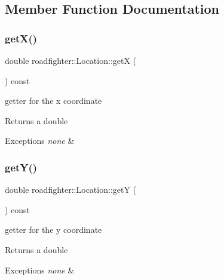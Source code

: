 \subsection{Member Function Documentation}
\mbox{\label{classroadfighter_1_1Location_aa06be0d4efd3bcf984c65d85506057fd}} 
\subsubsection{\texorpdfstring{get\+X()}{getX()}}
{\footnotesize\ttfamily double roadfighter\+::\+Location\+::getX (\begin{DoxyParamCaption}{ }\end{DoxyParamCaption}) const}

getter for the x coordinate \begin{DoxyReturn}{Returns}
a double 
\end{DoxyReturn}

\begin{DoxyExceptions}{Exceptions}
{\em none} & \\
\hline
\end{DoxyExceptions}
\mbox{\label{classroadfighter_1_1Location_ae249866ad25f0127591f1abd478a17cd}} 
\subsubsection{\texorpdfstring{get\+Y()}{getY()}}
{\footnotesize\ttfamily double roadfighter\+::\+Location\+::getY (\begin{DoxyParamCaption}{ }\end{DoxyParamCaption}) const}

getter for the y coordinate \begin{DoxyReturn}{Returns}
a double 
\end{DoxyReturn}

\begin{DoxyExceptions}{Exceptions}
{\em none} & \\
\hline
\end{DoxyExceptions}
\mbox{\label{classroadfighter_1_1Location_a44b584ce6b39f638d08709ae370feaf4}} 
